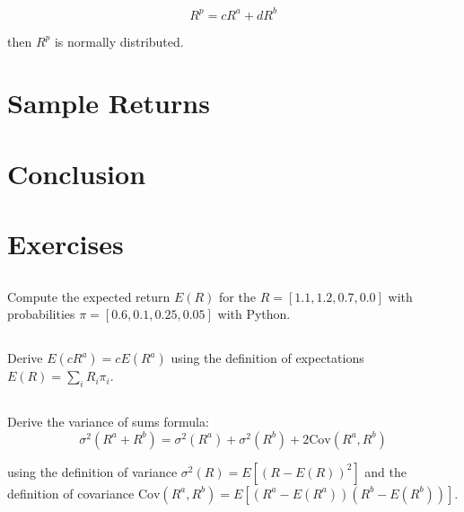 \begin{equation}
    R^p = cR^a + dR^b
\end{equation}

then $R^p$ is normally distributed. 

\section{Sample Returns}


\section{Conclusion}

\newpage
\section{Exercises}

\subsection{}

Compute the expected return $E(R)$ for the 
$R = [1.1, 1.2, 0.7, 0.0]$ with probabilities
$\pi = [0.6, 0.1, 0.25, 0.05]$ with Python.

\subsection{}

Derive $E(cR^a) = cE(R^a)$ using the 
definition of expectations $E(R) = \sum_i R_i \pi_i$.

\subsection{}

Derive the variance of sums formula:
\begin{equation}
    \sigma^2(R^a + R^b) = \sigma^2(R^a) + \sigma^2(R^b) + 2\text{Cov}(R^a, R^b)
\end{equation}

using the definition of variance $\sigma^2(R) = E[(R - E(R))^2]$ and
the definition of covariance $\text{Cov}(R^a, R^b) = E[(R^a - E(R^a))(R^b - E(R^b))]$.



\subsection{}

